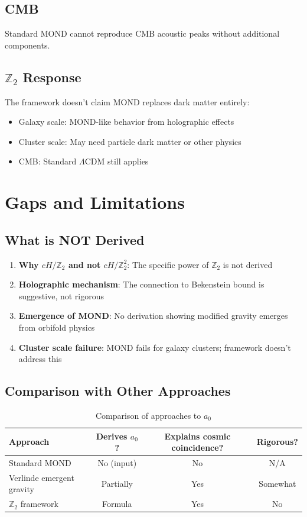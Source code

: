 \documentclass[12pt,a4paper]{article}
\begin{document}
\subsection{CMB}

Standard MOND cannot reproduce CMB acoustic peaks without additional components.

\subsection{$\mathbb{Z}_2$ Response}

The framework doesn't claim MOND replaces dark matter entirely:
\begin{itemize}
    \item Galaxy scale: MOND-like behavior from holographic effects
    \item Cluster scale: May need particle dark matter or other physics
    \item CMB: Standard $\Lambda$CDM still applies
\end{itemize}

\section{Gaps and Limitations}

\subsection{What is NOT Derived}

\begin{enumerate}
    \item \textbf{Why $cH/\mathbb{Z}_2$ and not $cH/\mathbb{Z}_2^2$}: The specific power of $\mathbb{Z}_2$ is not derived
    \item \textbf{Holographic mechanism}: The connection to Bekenstein bound is suggestive, not rigorous
    \item \textbf{Emergence of MOND}: No derivation showing modified gravity emerges from orbifold physics
    \item \textbf{Cluster scale failure}: MOND fails for galaxy clusters; framework doesn't address this
\end{enumerate}

\subsection{Comparison with Other Approaches}

\begin{table}[h]
\centering
\begin{tabular}{lccc}
\toprule
Approach & Derives $a_0$? & Explains cosmic coincidence? & Rigorous? \\
\midrule
Standard MOND & No (input) & No & N/A \\
Verlinde emergent gravity & Partially & Yes & Somewhat \\
$\mathbb{Z}_2$ framework & Formula & Yes & No \\
\bottomrule
\end{tabular}
\caption{Comparison of approaches to $a_0$}
\end{table}
\end{document}
